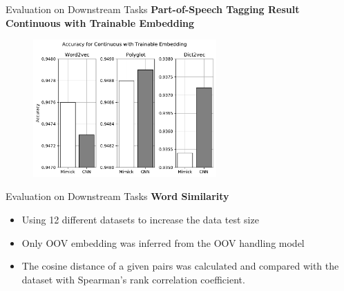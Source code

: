 \documentclass{beamer}
\begin{document}
\begin{frame}{Evaluation on Downstream Tasks}
    \textbf{Part-of-Speech Tagging Result Continuous with Trainable Embedding}
    \begin{figure}[H]
        \centering
        \includegraphics[width=70mm]{images/train_embed}
    \end{figure}
\end{frame}
\begin{frame}{Evaluation on Downstream Tasks}
    \textbf{Word Similarity}
    \begin{itemize}
        \item Using 12 different datasets to increase the data test size
        \item Only OOV embedding was inferred from the OOV handling model
        \item The cosine distance of a given pairs was calculated and
        compared with the dataset with Spearman's rank correlation
        coefficient.
    \end{itemize}
\end{frame}
\end{document}
